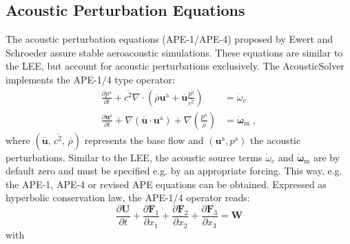 \subsection{Acoustic Perturbation Equations}
The acoustic perturbation equations (APE-1/APE-4) proposed by Ewert and Schroeder \cite{EwSc03} assure stable aeroacoustic simulations.
These equations are similar to the LEE, but account for acoustic perturbations exclusively.
The AcousticSolver implements the APE-1/4 type operator:
\begin{subequations}
    \begin{align}
        \frac{\partial p^\mathrm{a}}{\partial t} 
        + \overline{c^2} \nabla \cdot \left( \overline{\rho} \boldsymbol{u}^\mathrm{a} 
        + \overline{\boldsymbol{u}} \frac{p^\mathrm{a}}{\overline{c^2}} \right) 
        &= \dot{\omega}_\mathrm{c}
        \\
        \frac{\partial \boldsymbol{u}^\mathrm{a}}{\partial t} 
        + \nabla \left(\overline{\boldsymbol{u}} \cdot \boldsymbol{u}^\mathrm{a} \right) 
        + \nabla \left(\frac{p^\mathrm{a}}{\overline{\rho}}\right) 
        &= \dot{\boldsymbol{\omega}}_\mathrm{m}
        \;,
    \end{align}
\end{subequations}
where $(\overline{\boldsymbol{u}},\,\overline{c^2},\, \overline{\rho})$ represents the base flow and $(\boldsymbol{u}^\mathrm{a},p^\mathrm{a})$ the acoustic perturbations.
Similar to the LEE, the acoustic source terms $\dot{\omega}_\mathrm{c}$ and $\dot{\boldsymbol{\omega}}_\mathrm{m}$ are by default zero and must be specified e.g. by an appropriate forcing.
This way, e.g. the APE-1, APE-4 \cite{EwSc03} or revised APE equations \cite{Ge14} can be obtained.
Expressed as hyperbolic conservation law, the APE-1/4 operator reads:
\begin{equation}
\frac{\partial  \boldsymbol{U}}{\partial t}
+ \frac{\partial \boldsymbol{F}_1}{\partial x_1}
+ \frac{\partial \boldsymbol{F}_2}{\partial x_2}
+ \frac{\partial \boldsymbol{F}_3}{\partial x_3}
= \boldsymbol{W}
\end{equation}
with
